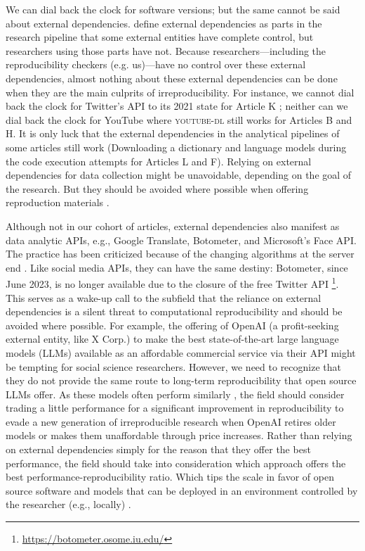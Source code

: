 We can dial back the clock for software versions; but the same cannot be said about external dependencies. \textcite{schoch:2023:CRC} define external dependencies as parts in the research pipeline that some external entities have complete control, but researchers using those parts have not. Because researchers---including the reproducibility checkers (e.g. us)---have no control over these external dependencies, almost nothing about these external dependencies can be done when they are the main culprits of irreproducibility. For instance, we cannot dial back the clock for Twitter's API to its 2021 state for Article K \parencite[see][]{assenmacher:2023:ERE}; neither can we dial back the clock for YouTube where \textsc{youtube-dl} still works for Articles B and H. It is only luck that the external dependencies in the analytical pipelines of some articles still work (Downloading a dictionary and language models during the code execution attempts for Articles L and F). Relying on external dependencies for data collection might be unavoidable, depending on the goal of the research. But they should be avoided where possible when offering reproduction materials \parencite[e.g.,][]{nonconsumptive,schoch:2023:CRC}.

Although not in our cohort of articles, external dependencies also manifest as data analytic APIs, e.g., Google Translate, Botometer, and  Microsoft's Face API. The practice has been criticized because of the changing algorithms at the server end \parencite[]{chan:2020:REC,rauchfleisch:2020:F,chen2023chatgpt}. Like social media APIs, they can have the same destiny: Botometer, since June 2023, is no longer available due to the closure of the free Twitter API \footnote{\url{https://botometer.osome.iu.edu/}}. This serves as a wake-up call to the subfield that the reliance on external dependencies is a silent threat to computational reproducibility \parencite[]{schoch:2023:CRC,davidson2023social} and should be avoided where possible. For example, the offering of OpenAI (a profit-seeking external entity, like X Corp.) to make the best state-of-the-art large language models (LLMs) available as an affordable commercial service via their API might be tempting for social science researchers. However, we need to recognize that they do not provide the same route to long-term reproducibility that open source LLMs offer. As these models often perform similarly \parencite[]{weber:2024:E}, the field should consider trading a little performance for a significant improvement in reproducibility to evade a new generation of irreproducible research when OpenAI retires older models or makes them unaffordable through price increases. Rather than relying on external dependencies simply for the reason that they offer the best performance, the field should take into consideration which approach offers the best performance-reproducibility ratio. Which tips the scale in favor of open source software and models that can be deployed in an environment controlled by the researcher (e.g., locally) \parencite[]{schoch:2023:CRC}.


